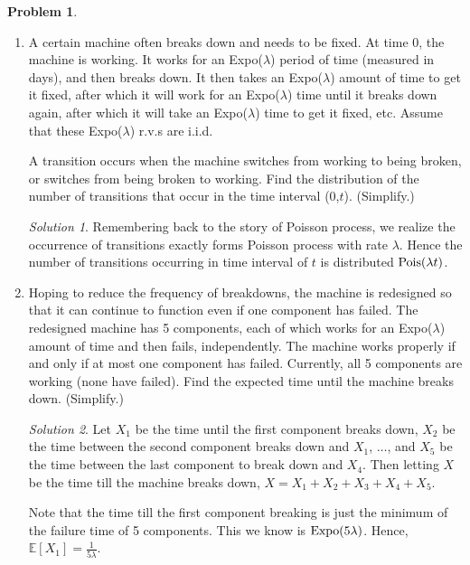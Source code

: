 \documentclass[11pt]{article}
\theoremstyle{definition}
\newtheorem{prob}[theo]{\color{Maroon} Problem}
\theoremstyle{remark}
\newtheorem*{soln}{\color{Maroon} Solution}
\newcommand{\E}[1]{\mathbb{E}\left[ #1 \right]}
\newcommand{\Expo}{\textnormal{Expo}}
\newcommand{\Pois}{\textnormal{Pois}}
\begin{document}
\begin{prob}
\begin{enumerate}[label = (\alph*)]
    \item A certain machine often breaks down and needs to be fixed. At time 0, the machine is working. It works for an Expo($\lambda$) period of time (measured in days), and then breaks down. It then takes an Expo($\lambda$) amount of time to get it fixed, after which it will work for an Expo($\lambda$) time until it breaks down again, after which it will take an Expo($\lambda$) time to get it fixed, etc. Assume that these Expo($\lambda$) r.v.s are i.i.d.

    A transition occurs when the machine switches from working to being broken, or switches from being broken to working. Find the distribution of the number of transitions that occur in the time interval (0,$t$). (Simplify.)
    
    \begin{soln} Remembering back to the story of Poisson process, we realize the occurrence of transitions exactly forms Poisson process with rate $\lambda$. Hence the number of transitions occurring in time interval of $t$ is distributed $\Pois(\lambda t)$.
    \end{soln}
    
    \dotfill
    
    \item Hoping to reduce the frequency of breakdowns, the machine is redesigned so that it can continue to function even if one component has failed. The redesigned machine has 5 components, each of which works for an Expo($\lambda$) amount of time and then fails, independently. The machine works properly if and only if at most one component has failed. Currently, all 5 components are working (none have failed). Find the expected time until the machine breaks down. (Simplify.)
    
    \begin{soln} Let $X_1$ be the time until the first component breaks down, $X_2$ be the time between the second component breaks down and $X_1$, $\ldots$, and $X_5$ be the time between the last component to break down and $X_4$. Then letting $X$ be the time till the machine breaks down, $X = X_1 + X_2 + X_3 + X_4 + X_5$. 
    
    Note that the time till the first component breaking is just the minimum of the failure time of 5 components. This we know is $\Expo(5 \lambda)$. Hence, $\E{X_1} = \frac{1}{5 \lambda}$. 
    

\end{soln}
\end{enumerate}
\end{prob}
\end{document}
